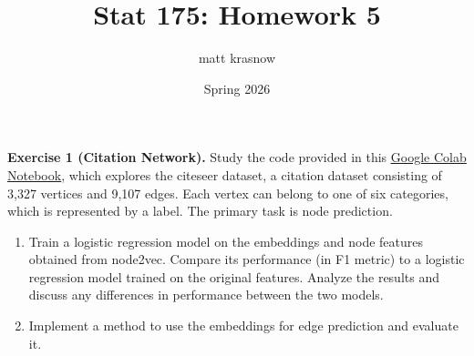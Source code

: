 \documentclass{article}
\title{\textbf{\textsf{Stat 175: Homework 5}}}
\author{\textsf{matt krasnow}}
\date{\textsf{Spring 2026}}
\begin{document}
\maketitle

\begin{tcolorbox}[colback = gray!16, enhanced, boxrule=0pt, frame hidden, sharp corners, borderline west={3pt}{-1.5pt}{black!80}, breakable]
\textbf{Exercise 1 (Citation Network).} Study the code provided in this \href{https://colab.research.google.com/drive/1dL7tu6HgB9a7vopCAq1DtSoXlHFfZf3V?usp=sharing}{\underline{Google Colab Notebook}}, which explores the citeseer dataset, a citation dataset consisting of 3,327 vertices and 9,107 edges. Each vertex can belong to one of six categories, which is represented by a label. The primary task is node prediction.
\begin{enumerate}[$(a)$]
    \item Train a logistic regression model on the embeddings and node features obtained from node2vec. Compare its performance (in F1 metric) to a logistic regression model trained on the original features. Analyze the results and discuss any differences in performance between the two models.
    \item Implement a method to use the embeddings for edge prediction and evaluate it.
\end{enumerate}
\end{tcolorbox}
\end{document}
